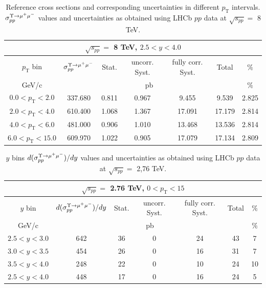 \begin{table}[htp]
\begin{center}
\begin{tabular}{|c||c|c|c|c|c|c|}
  \hline
  \multicolumn{7}{|c|}{$\sqrt{s_{pp}}=$ 8 TeV, $2.5<y<4.0$}\\
  \hline
  $p_\mathrm{T}$ bin & $\sigma_{pp}^{\Upsilon\rightarrow \mu^{+}\mu^{\--}} $ & Stat. & uncorr. Syst. & fully corr. Syst. & Total & $\%$ \\
  \hline
  GeV/c & \multicolumn{5}{c|}{pb} & $\%$ \\
  \hline
  $0.0 < p_\mathrm{T} < 2.0 $ & 337.680 & 0.811 & 0.967 & 9.455 & 9.539 & 2.825 \\
  \hline
  $2.0 < p_\mathrm{T} < 4.0 $& 610.400 & 1.068 & 1.367 & 17.091 & 17.179 & 2.814 \\
  \hline
  $4.0 < p_\mathrm{T} < 6.0 $& 481.000 & 0.906 & 1.010 & 13.468 & 13.536 & 2.814 \\
  \hline
  $6.0 < p_\mathrm{T} < 15.0 $& 609.970 & 1.022 & 0.905 & 17.079 & 17.134 & 2.809 \\
  \hline
\end{tabular}
\caption{Reference cross sections and corresponding uncertainties in different $p_\mathrm{T}$ intervals. $\sigma_{pp}^{\Upsilon\rightarrow \mu^{+}\mu^{\--}} $ values and uncertainties as obtained using LHCb $pp$ data at $\sqrt{s_{pp}}=$ 8 TeV.}\label{table:LHCbData8}
\end{center}
\end{table}

\begin{table}[!tp]
\begin{center}
\begin{tabular}{|c||c|c|c|c|c|c|}
  \hline
  \multicolumn{7}{|c|}{$\sqrt{s_{pp}}=$ 2.76 TeV, $0<p_\mathrm{T}<15$}\\
  \hline
  $y$ bin & $d(\sigma_{pp}^{\Upsilon\rightarrow \mu^{+}\mu^{\--}})/dy $ & Stat. & uncorr. Syst. & fully corr. Syst. & Total & $\%$ \\
  \hline
  GeV/c & \multicolumn{5}{c|}{pb} & $\%$ \\
  \hline
  $2.5 < y < 3.0 $ & 642 & 36 & 0 & 24 & 43 & 7 \\
  \hline
  $3.0 < y < 3.5 $& 454 & 26 & 0 & 16 & 31 & 7 \\
  \hline
  $3.5 < y < 4.0 $& 248 & 22 & 0 & 10 & 24 & 10 \\
  \hline
  $2.5 < y < 4.0 $& 448 & 17 & 0 & 16 & 24 & 5 \\
  \hline
\end{tabular}
\caption{$y$ bins $d(\sigma_{pp}^{\Upsilon\rightarrow \mu^{+}\mu^{\--}})/dy $ values and uncertainties as obtained using LHCb $pp$ data at $\sqrt{s_{pp}}=$ 2,76 TeV.}\label{table:LHCbY1sData276}
\end{center}
\end{table}

